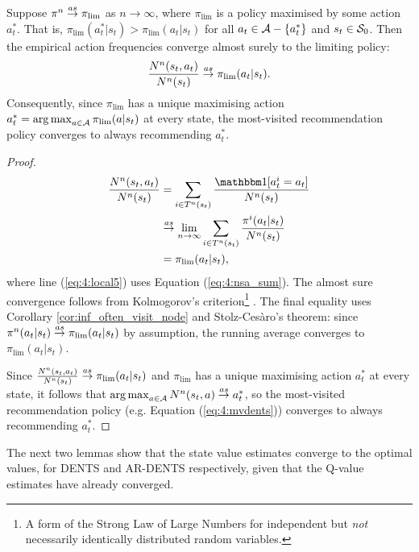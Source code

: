     \begin{lemma}
        \label{lem:search_policy_converge_mv_converge}
        Suppose $\pi^n \overset{as}{\to} \pi_{\lim}$ as $n\rightarrow\infty$, where $\pi_{\lim}$ is a policy maximised by some action $a^*_t$. That is, $\pi_{\lim}(a^*_t|s_t) > \pi_{\lim}(a_t|s_t)$ for all $a_t \in \mathcal{A} - \{a^*_t\}$ and $s_t\in\mathcal{S}_0$. Then the empirical action frequencies converge almost surely to the limiting policy:
        \begin{align}
            \frac{N^n(s_t,a_t)}{N^n(s_t)} \overset{as}{\to} \pi_{\lim}(a_t|s_t).
        \end{align}
        Consequently, since $\pi_{\lim}$ has a unique maximising action $a^*_t = \operatorname*{arg\,max}_{a\in\mathcal{A}} \pi_{\lim}(a|s_t)$ at every state, the most-visited recommendation policy converges to always recommending $a^*_t$.
    \end{lemma}
    \begin{proof}
        \begin{align}
            \frac{N^n(s_t,a_t)}{N^n(s_t)}
                &=  \sum_{i\in T^n(s_t)} \frac{\one[a_t^i = a_t]}{N^n(s_t)} \label{eq:4:local5}\\
                &\raas \lim_{n\rightarrow\infty} \sum_{i\in T^n(s_t)} \frac{\pi^i(a_t|s_t)}{N^n(s_t)} \\
                &= \pi_{\lim}(a_t|s_t),
        \end{align}
        where line (\ref{eq:4:local5}) uses Equation (\ref{eq:4:nsa_sum}). The almost sure convergence follows from Kolmogorov's criterion\footnote{A form of the Strong Law of Large Numbers for independent but \textit{not} necessarily identically distributed random variables.} \cite{intro_to_prob_theory}. The final equality uses Corollary \ref{cor:inf_often_visit_node} and Stolz-Ces\`{a}ro's theorem: since $\pi^n(a_t|s_t)\overset{as}{\to}\pi_{\lim}(a_t|s_t)$ by assumption, the running average converges to $\pi_{\lim}(a_t|s_t)$.
        
        Since $\frac{N^n(s_t,a_t)}{N^n(s_t)} \overset{as}{\to} \pi_{\lim}(a_t|s_t)$ and $\pi_{\lim}$ has a unique maximising action $a^*_t$ at every state, it follows that $\operatorname*{arg\,max}_{a\in\mathcal{A}} N^n(s_t,a) \overset{as}{\to} a^*_t$, so the most-visited recommendation policy (e.g. Equation (\ref{eq:4:mvdents})) converges to always recommending $a^*_t$.
    \end{proof}

    \proofsep




    The next two lemmas show that the state value estimates converge to the optimal values, for DENTS and AR-DENTS respectively, given that the Q-value estimates have already converged.

